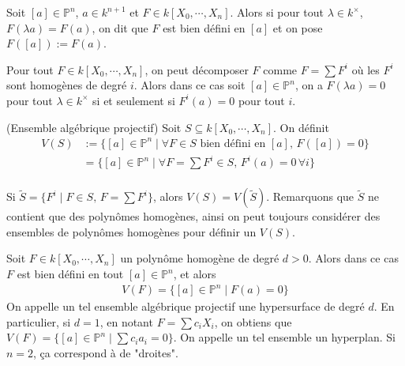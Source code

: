         \begin{defi}
            Soit $[a] \in \mathbb{P}^n$, $a \in k^{n+1}$ et $F \in k[X_0, \cdots, X_n]$. Alors si pour tout $\lambda \in k^\times$, $F(\lambda a) = F(a)$, on dit que $F$ est bien défini en $[a]$ et on pose$F([a]) := F(a)$.
        \end{defi}
        \begin{remq}
            Pour tout $F \in k[X_0, \cdots, X_n]$, on peut décomposer $F$ comme $F = \sum F^i$ où les $F^i$ sont homogènes de degré $i$. Alors dans ce cas soit $[a] \in \mathbb{P}^n$, on a $F(\lambda a) = 0$ pour tout $\lambda \in k^\times$ si et seulement si $F^i(a) = 0$ pour tout $i$. 
        \end{remq}
        \begin{defi} (Ensemble algébrique projectif)
            Soit $S \subseteq k[X_0, \cdots, X_n]$. On définit
            \begin{align*}
                V(S) &:= \{[a] \in \mathbb{P}^n \mid \forall F \in S \text{ bien défini en } [a],\, F([a]) = 0\} \\
                &= \{[a] \in \mathbb{P}^n \mid \forall F = \sum F^i \in S,\, F^i(a) = 0 \, \forall i\} \\
            \end{align*}
        \end{defi}
        \begin{remq}
            Si $\tilde S = \{F^i \mid F \in S,\, F = \sum F^i\}$, alors $V(S) = V(\tilde S)$. Remarquons que $\tilde S$ ne contient que des polynômes homogènes, ainsi on peut toujours considérer des ensembles de polynômes homogènes pour définir un $V(S)$.
        \end{remq}
        \begin{expl}
            Soit $F \in k[X_0, \cdots, X_n]$ un polynôme homogène de degré $d > 0$. Alors dans ce cas $F$ est bien défini en tout $[a] \in \mathbb{P}^n$, et alors
            \begin{align*}
                V(F) = \{[a] \in \mathbb{P}^n \mid F(a) = 0\}
            \end{align*}
            On appelle un tel ensemble algébrique projectif une hypersurface de degré $d$. En particulier, si $d = 1$, en notant $F = \sum c_iX_i$, on obtiens que $V(F) = \{[a] \in \mathbb{P}^n \mid \sum c_ia_i = 0\}$. On appelle un tel ensemble un hyperplan. Si $n = 2$, ça correspond à de "droites".
        \end{expl}
